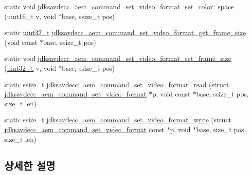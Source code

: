 \begin{DoxyCompactItemize}
\item 
static void \hyperlink{group__command__set__video__format_ga918350cb09aa3b735368efbb398f62b3}{jdksavdecc\+\_\+aem\+\_\+command\+\_\+set\+\_\+video\+\_\+format\+\_\+set\+\_\+color\+\_\+space} (uint16\+\_\+t v, void $\ast$base, ssize\+\_\+t pos)
\item 
static \hyperlink{parse_8c_a6eb1e68cc391dd753bc8ce896dbb8315}{uint32\+\_\+t} \hyperlink{group__command__set__video__format_gad626b7523c443035f32956aebf8f38bd}{jdksavdecc\+\_\+aem\+\_\+command\+\_\+set\+\_\+video\+\_\+format\+\_\+get\+\_\+frame\+\_\+size} (void const $\ast$base, ssize\+\_\+t pos)
\item 
static void \hyperlink{group__command__set__video__format_gaacab81fe8072b9fc09986ff1f4dddc27}{jdksavdecc\+\_\+aem\+\_\+command\+\_\+set\+\_\+video\+\_\+format\+\_\+set\+\_\+frame\+\_\+size} (\hyperlink{parse_8c_a6eb1e68cc391dd753bc8ce896dbb8315}{uint32\+\_\+t} v, void $\ast$base, ssize\+\_\+t pos)
\item 
static ssize\+\_\+t \hyperlink{group__command__set__video__format_gac357d55b0e6c66ff09a1eed8e7b9a615}{jdksavdecc\+\_\+aem\+\_\+command\+\_\+set\+\_\+video\+\_\+format\+\_\+read} (struct \hyperlink{structjdksavdecc__aem__command__set__video__format}{jdksavdecc\+\_\+aem\+\_\+command\+\_\+set\+\_\+video\+\_\+format} $\ast$p, void const $\ast$base, ssize\+\_\+t pos, size\+\_\+t len)
\item 
static ssize\+\_\+t \hyperlink{group__command__set__video__format_ga08501a4c0418146b71cf49e4d823eabc}{jdksavdecc\+\_\+aem\+\_\+command\+\_\+set\+\_\+video\+\_\+format\+\_\+write} (struct \hyperlink{structjdksavdecc__aem__command__set__video__format}{jdksavdecc\+\_\+aem\+\_\+command\+\_\+set\+\_\+video\+\_\+format} const $\ast$p, void $\ast$base, size\+\_\+t pos, size\+\_\+t len)
\end{DoxyCompactItemize}


\subsection{상세한 설명}


